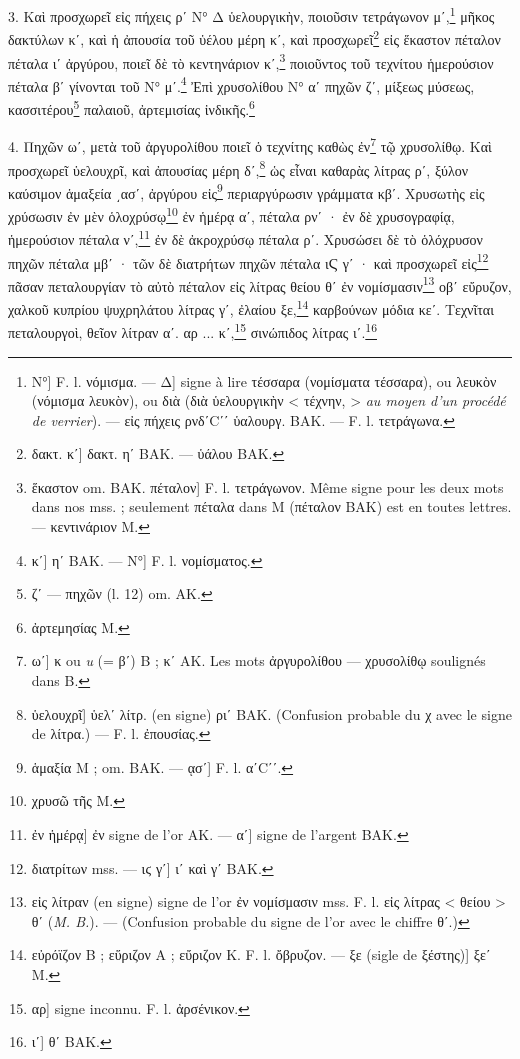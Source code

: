 \documentclass[a4paper, 11pt, oneside, polutonikogreek, french]{article}
\begin{document}
3. Καὶ προσχωρεῖ εἰς πήχεις ρʹ Ν° Δ ὑελουργικὴν, ποιοῦσιν τετράγωνον μʹ,\footnote{Ν°] F. l. νόμισμα. --- Δ] signe à lire τέσσαρα (νομίσματα τέσσαρα), ou λευκὸν (νόμισμα λευκὸν), ou διὰ (διὰ ὑελουργικὴν < τέχνην, > \emph{au moyen d'un procédé de verrier}). --- εἰς πήχεις ρνδʹCʹʹ ὑαλουργ. BAK. --- F. l. τετράγωνα.} μῆκος δακτύλων κʹ, καὶ ἡ ἀπουσία τοῦ ὑέλου μέρη κʹ, καὶ προσχωρεῖ\footnote{δακτ. κʹ] δακτ. ηʹ BAK. --- ὑάλου BAK.} εἰς ἕκαστον πέταλον πέταλα ιʹ ἀργύρου, ποιεῖ δὲ τὸ κεντηνάριον κʹ,\footnote{ἕκαστον om. BAK. πέταλον] F. l. τετράγωνον. Même signe pour les deux mots dans nos mss. ; seulement πέταλα dans M (πέταλον BAK) est en toutes lettres. --- κεντινάριον M.} ποιοῦντος τοῦ τεχνίτου ἡμερούσιον πέταλα βʹ γίνονται τοῦ Ν° μʹ.\footnote{κʹ] ηʹ BAK. --- Ν°] F. l. νομίσματος.} Ἐπὶ χρυσολίθου Ν° αʹ πηχῶν ζʹ, μίξεως μύσεως, κασσιτέρου\footnote{ζʹ --- πηχῶν (l. 12) om. AK.} παλαιοῦ, ἀρτεμισίας ἰνδικῆς.\footnote{ἀρτεμησίας M.}

4. Πηχῶν ωʹ, μετὰ τοῦ ἀργυρολίθου ποιεῖ ὁ τεχνίτης καθὼς ἐν\footnote{ωʹ] κ ou \emph{u} (= βʹ) B ; κʹ AΚ. Les mots ἀργυρολίθου --- χρυσολίθῳ soulignés dans B.} τῷ χρυσολίθῳ. Καὶ προσχωρεῖ ὑελουχρῖ, καὶ ἀπουσίας μέρη δʹ,\footnote{ὑελουχρῖ] ὑελʹ λίτρ. (en signe) ριʹ BAK. (Confusion probable du χ avec le signe de λίτρα.) --- F. l. ἐπουσίας.} ὡς εἶναι καθαρὰς λίτρας ρʹ, ξύλον καύσιμον ἁμαξεία ͵ασʹ, ἀργύρου εἰς\footnote{ἁμαξία M ; om. BAK. --- ᾳσʹ] F. l. αʹCʹʹ.} περιαργύρωσιν γράμματα κβʹ. Χρυσωτὴς εἰς χρύσωσιν ἐν μὲν ὁλοχρύσῳ\footnote{χρυσῶ τῆς M.} ἐν ἡμέρᾳ αʹ, πέταλα ρνʹ · ἐν δὲ χρυσογραφίᾳ, ἡμερούσιον πέταλα νʹ,\footnote{ἐν ἡμέρᾳ] ἐν signe de l'or AK. --- αʹ] signe de l'argent BAK.} ἐν δὲ ἀκροχρύσῳ πέταλα ρʹ. Χρυσώσει δὲ τὸ ὁλόχρυσον πηχῶν πέταλα μβʹ · τῶν δὲ διατρήτων πηχῶν πέταλα ιϚ γʹ · καὶ προσχωρεῖ εἰς\footnote{διατρίτων mss. --- ιϛ γʹ] ιʹ καὶ γʹ BAK.} πᾶσαν πεταλουργίαν τὸ αὐτὸ πέταλον εἰς λίτρας θείου θʹ ἐν νομίσμασιν\footnote{εἰς λίτραν (en signe) signe de l'or ἐν νομίσμασιν mss. F. l. εἰς λίτρας < θείου > θʹ (\emph{M. B.}). --- (Confusion probable du signe de l'or avec le chiffre θʹ.)} οβʹ εὔρυζον, χαλκοῦ κυπρίου ψυχρηλάτου λίτρας γʹ, ἐλαίου ξε,\footnote{εὐρόϊζον B ; εὕριζον A ; εὔριζον K. F. l. ὄβρυζον. --- ξε (sigle de ξέστης)] ξεʹ M.} καρβούνων μόδια κεʹ. Τεχνῖται πεταλουργοὶ, θεῖον λίτραν αʹ. αρ ... κʹ,\footnote{αρ] signe inconnu. F. l. ἀρσένικον.} σινώπιδος λίτρας ιʹ.\footnote{ιʹ] θʹ BAK.}
\end{document}
